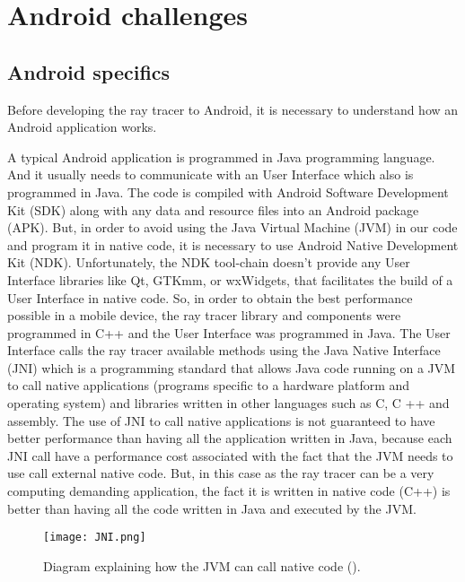 \chapter{Android challenges}

\section{Android specifics}

\par
Before developing the ray tracer to Android, it is necessary to understand how an Android application works.

\par
A typical Android application is programmed in Java programming language.
And it usually needs to communicate with an User Interface which also is programmed in Java.
The code is compiled with Android Software Development Kit (SDK) along with any data and resource files into an Android package (APK).
But, in order to avoid using the Java Virtual Machine (JVM) in our code and program it in native code, it is necessary to use Android Native Development Kit (NDK).
Unfortunately, the NDK tool-chain doesn't provide any User Interface libraries like Qt, GTKmm, or wxWidgets, that facilitates the build of a User Interface in native code.
So, in order to obtain the best performance possible in a mobile device, the ray tracer library and components were programmed in C++ and the User Interface was programmed in Java.
The User Interface calls the ray tracer available methods using the Java Native Interface (JNI) which is a programming standard that allows Java code running on a JVM to call native applications (programs specific to a hardware platform and operating system) and libraries written in other languages such as C, C ++ and assembly.
The use of JNI to call native applications is not guaranteed to have better performance than having all the application written in Java, because each JNI call have a performance cost associated with the fact that the JVM needs to use call external native code.
But, in this case as the ray tracer can be a very computing demanding application, the fact it is written in native code (C++) is better than having all the code written in Java and executed by the JVM.

\begin{figure}[H]
	\centering
	\caption{Diagram explaining how the JVM can call native code (\cite{JNI}).}
	\label{JNI.}
	\texttt{[image: JNI.png]}
\end{figure}


